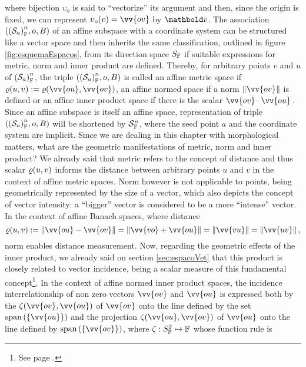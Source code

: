 where bijection $\upsilon_o$ is said to ``vectorize'' its argument and then, since the origin is fixed, we can represent $\fua{\upsilon_o}{v}=\vv{ov}$ by $\vto{v}$. The association $(\eamsd{S}{F}{a}{n},o,B)$ of an affine subspace with a coordinate system can be structured like a vector space and then inherits the same classification, outlined in figure \ref{fig:esquemaEspacos}, from its direction space $S_\cam{F}$ if suitable expressions for metric, norm and inner product are defined. Thereby, for arbitrary points $v$ and $u$ of $\eamsd{S}{F}{a}{n}$, the triple $(\eamsd{S}{F}{a}{n},o,B)$ is called an affine metric space if $\fua{\varrho}{u,v}:=\fua{\varrho}{\vv{ou},\vv{ov}}$, an affine normed space if a norm $\|\vv{ov}\|$ is defined or an affine inner product space if there is the scalar $\vv{ov}\cdot\vv{ou}\,$. Since an affine subspace is itself an affine space, representation of triple $(\eamsd{S}{F}{a}{n},o,B)$ will be shortened by $\eamd{S}{F}{n}$, where the seed point $a$ and the coordinate system are implicit. Since we are dealing in this chapter with morphological matters, what are the geometric manifestations of metric, norm and inner product? We already said that metric refers to the concept of distance and thus scalar $\fua{\varrho}{u,v}$ informs the distance between arbitrary points $u$ and $v$ in the context of affine metric spaces. Norm however is not applicable to points, being geometrically represented by the size of a vector, which also depicts the concept of vector intensity: a ``bigger'' vector is considered to be a more ``intense'' vector. In the context of affine Banach spaces, where distance
\begin{equation}\label{eq:affDistance}
\fua{\varrho}{u,v} := \|\vv{ou} - \vv{ov}\|=\|\vv{vo} + \vv{ou}\|=\|\vv{vu}\|=\|\vv{uv}\|\,,
\end{equation}
norm enables distance measurement. Now, regarding the geometric effects of the inner product, we already said on section \ref{sec:espacoVet} that this product is closely related to vector incidence, being a scalar measure of this fundamental concept\footnote{See page \pageref{sec:incidence}.}. In the context of affine normed inner product spaces, the incidence interrelationship of non zero vectors $\vv{ov}$ and $\vv{ou}$ is expressed both by the  $\fua{\zeta}{\vv{ov},\vv{ou}}$ of $\vv{ov}$ onto the line defined by the set $\spn{(\{\vv{ou}\})}$ and the projection $\fua{\zeta}{\vv{ou},\vv{ov}}$ of $\vv{ou}$ onto the line defined by $\spn{(\{\vv{ov}\})}$, where $\map{\zeta}{S_\cam{F}^2}{\cam{F}}$ whose function rule is
